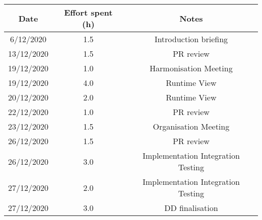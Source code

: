 \documentclass[../../main.tex]{subfiles}
\begin{document}
\begin{center}
    \begin{tabular}{|c| |c| |c|} 
        \hline
        Date & Effort spent (h) & Notes\\ [0.5ex] 
        \hline\hline
        6/12/2020 & 1.5 & Introduction briefing\\ 
        13/12/2020 & 1.5 & PR review\\
        19/12/2020 & 1.0 & Harmonisation Meeting\\
        19/12/2020 & 4.0 & Runtime View\\
        20/12/2020 & 2.0 & Runtime View\\
        22/12/2020 & 1.0 & PR review\\
        23/12/2020 & 1.5 & Organisation Meeting\\
        26/12/2020 & 1.5 & PR review\\
        26/12/2020 & 3.0 & Implementation Integration Testing\\
        27/12/2020 & 2.0 & Implementation Integration Testing\\
        27/12/2020 & 3.0 & DD finalisation\\
        \hline
    \end{tabular}
\end{center}
\end{document}
